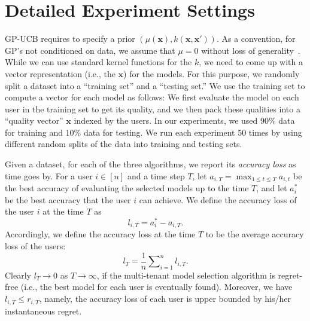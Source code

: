 \documentclass[letterpaper]{vldb}
\begin{document}
\newpage


  



\appendix


\section{Detailed Experiment Settings}

GP-UCB requires to specify a prior $(\mu(\mathbf{x}), k(\mathbf{x},\mathbf{x}'))$.
As a convention, for GP's not conditioned on data, we assume that $\mu=0$ without loss of generality~\cite{SrinivasKKS10}.
While we can use standard kernel functions for the $k$, we need to come up with a vector representation (i.e., the $\mathbf{x}$) for the models.
For this purpose, we randomly split a dataset into a ``training set'' and a ``testing set.''
We use the training set to compute a vector for each model as follows:
We first evaluate the model on each user in the training set to get its quality, and we then pack these qualities into a ``quality vector'' $\mathbf{x}$ indexed by the users.
In our experiments, we used 90\% data for training and 10\% data for testing.
We run each experiment 50 times by using different random splits of the data into training and testing sets.

Given a dataset, for each of the three algorithms, we report its \emph{accuracy loss} as time goes by.
For a user $i\in[n]$ and a time step $T$, let $a_{i,T}=\max_{1\leq t\leq T} a_{i,t}$ be the best accuracy of evaluating the selected models up to the time $T$, and let $a_i^{*}$ be the best accuracy that the user $i$ can achieve.
We define the accuracy loss of the user $i$ at the time $T$ as
\begin{equation}
l_{i,T}=a_i^{*}-a_{i,T}.
\end{equation}
Accordingly, we define the accuracy loss at the time $T$ to be the average accuracy loss of the users:
\begin{equation}\label{eq:accuracy-loss}
l_T=\frac{1}{n}\sum\nolimits_{i=1}^{n}l_{i,T}.
\end{equation}
Clearly $l_T\to 0$ as $T\to\infty$, if the multi-tenant model selection algorithm is regret-free (i.e., the best model for each user is eventually found).
Moreover, we have $l_{i,T}\leq r_{i,T}$, namely, the accuracy loss of each user is upper bounded by his/her instantaneous regret.
\end{document}
